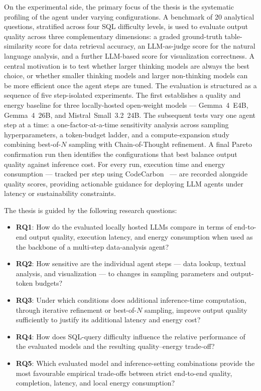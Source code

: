 On the experimental side, the primary focus of the thesis is the systematic profiling of the
agent under varying configurations. A benchmark of 20 analytical questions, stratified across
four SQL difficulty levels, is used to evaluate output quality across three complementary
dimensions: a graded ground-truth table-similarity score for data retrieval
accuracy, an LLM-as-judge score for the natural language analysis, and a
further LLM-based score for visualization correctness. A central motivation is
to test whether larger thinking models are always the best choice, or whether
smaller thinking models and larger non-thinking models can be more efficient
once the agent steps are tuned. The evaluation is structured as a sequence of five step-isolated
experiments. The first establishes a quality and energy baseline for three locally-hosted
open-weight models --- Gemma~4~E4B, Gemma~4~26B, and Mistral~Small~3.2~24B. The subsequent
tests vary one agent step at a time: a one-factor-at-a-time sensitivity analysis across
sampling hyperparameters, a token-budget ladder, and a compute-expansion study combining
best-of-$N$ sampling with Chain-of-Thought refinement. A final Pareto confirmation run then
identifies the configurations that best balance output quality against inference cost. For
every run, execution time and energy consumption --- tracked per step using
CodeCarbon~\cite{lottick2019codecarbon} --- are recorded alongside quality scores, providing
actionable guidance for deploying LLM agents under latency or sustainability constraints.

The thesis is guided by the following research questions:
\begin{itemize}
    \item \textbf{RQ1}: How do the evaluated locally hosted LLMs compare in terms of
          end-to-end output quality, execution latency, and energy consumption when used
          as the backbone of a multi-step data-analysis agent?
    \item \textbf{RQ2}: How sensitive are the individual agent steps --- data lookup,
          textual analysis, and visualization --- to changes in sampling parameters and
          output-token budgets?
    \item \textbf{RQ3}: Under which conditions does additional inference-time
          computation, through iterative refinement or best-of-$N$ sampling, improve
          output quality sufficiently to justify its additional latency and energy cost?
    \item \textbf{RQ4}: How does SQL-query difficulty influence the relative performance
          of the evaluated models and the resulting quality--energy trade-off?
    \item \textbf{RQ5}: Which evaluated model and inference-setting combinations provide
          the most favourable empirical trade-offs between strict end-to-end quality,
          completion, latency, and local energy consumption?
\end{itemize}

